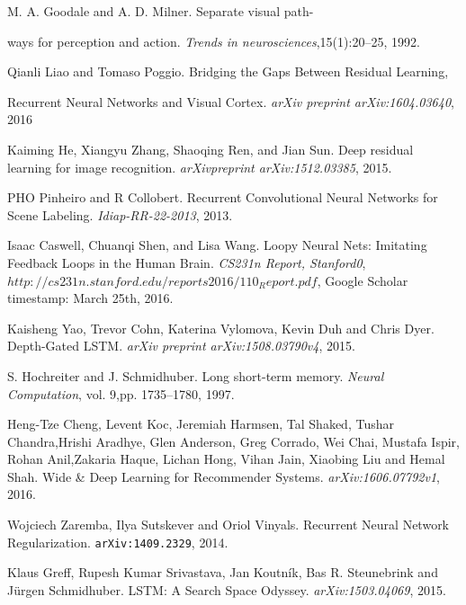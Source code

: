 \documentclass{article}
\begin{document}
\begin{thebibliography}{9}




M. A. Goodale and A. D. Milner. Separate visual path-


ways for perception and action. \textit{Trends in neurosciences},15(1):20–25, 1992.




Qianli Liao and Tomaso Poggio. Bridging the Gaps Between Residual Learning,


Recurrent Neural Networks and Visual Cortex. \textit{arXiv preprint arXiv:1604.03640}, 2016




Kaiming He, Xiangyu Zhang, Shaoqing Ren, and Jian Sun. Deep residual learning for image recognition. \textit{arXivpreprint arXiv:1512.03385}, 2015.




PHO Pinheiro and R Collobert. Recurrent Convolutional Neural Networks for Scene Labeling. \textit{Idiap-RR-22-2013}, 2013.




Isaac Caswell, Chuanqi Shen, and Lisa Wang. Loopy Neural Nets: Imitating Feedback Loops in the Human Brain. \textit{CS231n Report, Stanford0}, \texttt{$http://cs231n.stanford.edu/reports2016/110_Report.pdf$}, Google Scholar timestamp: March 25th, 2016.




Kaisheng Yao, Trevor Cohn, Katerina Vylomova, Kevin Duh and Chris Dyer. Depth-Gated LSTM. \textit{arXiv preprint arXiv:1508.03790v4}, 2015.




S. Hochreiter and J. Schmidhuber. Long short-term memory. \textit{Neural Computation}, vol. 9,pp. 1735–1780, 1997.


Heng-Tze Cheng, Levent Koc, Jeremiah Harmsen, Tal Shaked, Tushar Chandra,Hrishi Aradhye, Glen Anderson, Greg Corrado, Wei Chai, Mustafa Ispir, Rohan Anil,Zakaria Haque, Lichan Hong, Vihan Jain, Xiaobing Liu and Hemal Shah. Wide \& Deep Learning for Recommender Systems. \textit{arXiv:1606.07792v1}, 2016.

Wojciech Zaremba, Ilya Sutskever and Oriol Vinyals.
Recurrent Neural Network Regularization. \texttt{arXiv:1409.2329}, 2014.

Klaus Greff, Rupesh Kumar Srivastava, Jan Koutník, Bas R. Steunebrink and Jürgen Schmidhuber. LSTM: A Search Space Odyssey. \textit{	arXiv:1503.04069}, 2015.

\end{thebibliography}
\end{document}
